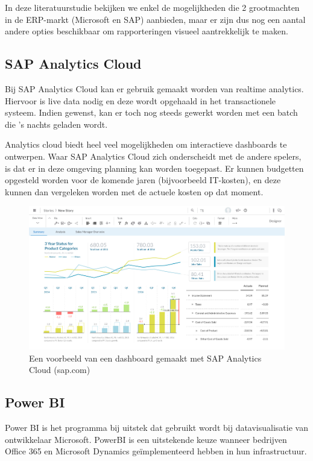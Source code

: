 In deze literatuurstudie bekijken we enkel de mogelijkheden die 2 grootmachten in de ERP-markt (Microsoft en SAP) aanbieden, maar er zijn dus nog een aantal andere opties beschikbaar om rapporteringen visueel aantrekkelijk te maken. 

\subsection{SAP Analytics Cloud}
Bij SAP Analytics Cloud kan er gebruik gemaakt worden van realtime analytics. Hiervoor is live data nodig en deze wordt opgehaald in het transactionele systeem. Indien gewenst, kan er toch nog steeds gewerkt worden met een batch die 's nachts geladen wordt. 

Analytics cloud biedt heel veel mogelijkheden om interactieve dashboards te ontwerpen. Waar SAP Analytics Cloud zich onderscheidt met de andere spelers, is dat er in deze omgeving planning kan worden toegepast. Er kunnen budgetten opgesteld worden voor de komende jaren (bijvoorbeeld IT-kosten), en deze kunnen dan vergeleken worden met de actuele kosten op dat moment. 

\begin{figure}[h]
	\centering
	\includegraphics[scale=0.45]{../images/sac.png}
	\caption{Een voorbeeld van een dashboard gemaakt met SAP Analytics Cloud (sap.com)}
	\label{fig:sac}
\end{figure}

\subsection{Power BI}
Power BI is het programma bij uitstek dat gebruikt wordt bij datavisualisatie van ontwikkelaar Microsoft. PowerBI is een uitstekende keuze wanneer bedrijven Office 365 en Microsoft Dynamics geïmplementeerd hebben in hun infrastructuur.

